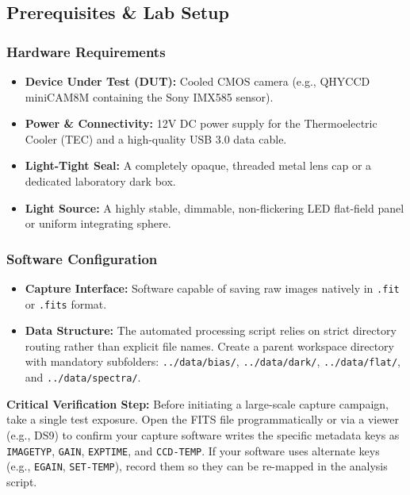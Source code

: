 \documentclass[11pt,a4paper]{article}
\begin{document}
\subsection{Prerequisites \& Lab Setup}
\subsubsection{Hardware Requirements}
\begin{itemize}[leftmargin=*]
    \item \textbf{Device Under Test (DUT):} Cooled CMOS camera (e.g., QHYCCD miniCAM8M containing the Sony IMX585 sensor).
    \item \textbf{Power \& Connectivity:} 12V DC power supply for the Thermoelectric Cooler (TEC) and a high-quality USB 3.0 data cable.
    \item \textbf{Light-Tight Seal:} A completely opaque, threaded metal lens cap or a dedicated laboratory dark box.
    \item \textbf{Light Source:} A highly stable, dimmable, non-flickering LED flat-field panel or uniform integrating sphere.
\end{itemize}

\subsubsection{Software Configuration}
\begin{itemize}[leftmargin=*]
    \item \textbf{Capture Interface:} Software capable of saving raw images natively in \texttt{.fit} or \texttt{.fits} format.
    \item \textbf{Data Structure:} The automated processing script relies on strict directory routing rather than explicit file names. Create a parent workspace directory with mandatory subfolders: \texttt{../data/bias/}, \texttt{../data/dark/}, \texttt{../data/flat/}, and \texttt{../data/spectra/}.
\end{itemize}

\begin{mdframed}[backgroundcolor=procbg, linecolor=secondary, linewidth=1.5pt, roundcorner=4pt]
\textbf{Critical Verification Step:} Before initiating a large-scale capture campaign, take a single test exposure. Open the FITS file programmatically or via a viewer (e.g., DS9) to confirm your capture software writes the specific metadata keys as \texttt{IMAGETYP}, \texttt{GAIN}, \texttt{EXPTIME}, and \texttt{CCD-TEMP}. If your software uses alternate keys (e.g., \texttt{EGAIN}, \texttt{SET-TEMP}), record them so they can be re-mapped in the analysis script.
\end{mdframed}
\end{document}
